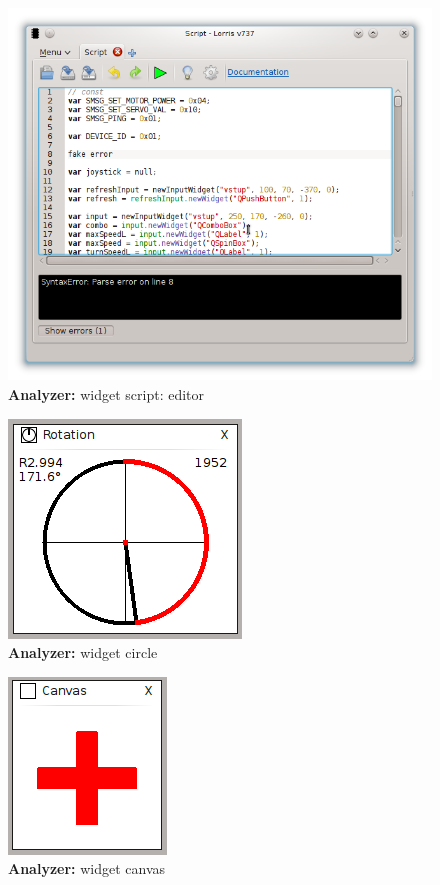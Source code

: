 \documentclass[12pt, a4paper, oneside]{article}
\newcommand{\B}{\textbf} %
\begin{document}
\begin{figure}[h]
\begin{center}
\includegraphics[width=\textwidth]{../img/w_script_src.png}
\caption{\B{Analyzer:} widget script: editor}
\label{script_src}
\end{center}
\end{figure}

\begin{figure}[H]
\begin{center}
\includegraphics[scale=1]{../img/w_circle.png}
\caption{\B{Analyzer:} widget circle}
\end{center}
\end{figure}

\begin{figure}[H]
\begin{center}
\includegraphics[scale=1]{../img/w_canvas.png}
\caption{\B{Analyzer:} widget canvas}
\end{center}
\end{figure}
\end{document}
